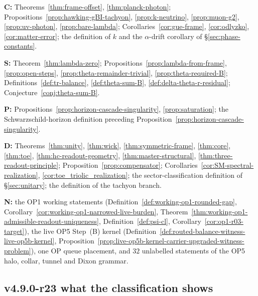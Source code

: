 \noindent\textbf{C:} Theorems~\ref{thm:frame-offset}, \ref{thm:planck-photon}; Propositions~\ref{prop:hawking-gBI-tachyon},
\ref{prop:k-neutrino}, \ref{prop:muon-g2}, \ref{prop:uv-photon}, \ref{prop:bare-lambda}; Corollaries~\ref{cor:gue-frame},
\ref{cor:odlyzko}, \ref{cor:matter-error}; the definition of \(k\) and the \(\alpha\)-drift corollary of \S\ref{sec:phase-constants}.

\noindent\textbf{S:} Theorem~\ref{thm:lambda-zero}; Propositions~\ref{prop:lambda-from-frame}, \ref{prop:open-steps},
\ref{prop:theta-remainder-trivial}, \ref{prop:theta-required-B}; Definitions~\ref{def:tr-balance}, \ref{def:theta-sum-B},
\ref{def:delta-theta-r-residual}; Conjecture~\ref{conj:theta-sum-B}.

\noindent\textbf{P:} Propositions~\ref{prop:horizon-cascade-singularity}, \ref{prop:saturation}; the Schwarzschild-horizon definition
preceding Proposition~\ref{prop:horizon-cascade-singularity}.

\noindent\textbf{D:} Theorems~\ref{thm:unity}, \ref{thm:wick}, \ref{thm:symmetric-frame}, \ref{thm:core}, \ref{thm:toe},
\ref{thm:hc-readout-geometry}, \ref{thm:master-structural}, \ref{thm:three-readout-principle}; Proposition~\ref{prop:compensator};
Corollaries~\ref{cor:SM-spectral-realization}, \ref{cor:toe_triolic_realization}; the sector-classification definition of
\S\ref{sec:unitary}; the definition of the tachyon branch.

\noindent\textbf{N:} the OP1 working statements (Definition~\ref{def:working-op1-rounded-gap},
Corollary~\ref{cor:working-op1-narrowed-live-burden}, Theorem~\ref{thm:working-op1-admissible-readout-uniqueness},
Definition~\ref{def:psi-cl}, Corollary~\ref{cor:op1-r03-target}), the live OP5 Step~(B) kernel
(Definition~\ref{def:routed-balance-witness-live-op5b-kernel},
Proposition~\ref{prop:live-op5b-kernel-carrier-upgraded-witness-problem}), one OP queue placement, and \(32\) unlabelled
statements of the OP5 halo, collar, tunnel and Dixon grammar.

\subsection*{v4.9.0-r23 what the classification shows}
\label{subsec:v490-r23-findings}

